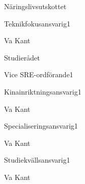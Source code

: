 \documentclass[10pt]{article}
\begin{document}
\begin{valforslagslista}
        \begin{utskott}{Näringslivsutskottet}
            \begin{post}{Teknikfokusansvarig}{1}
                \item Va Kant
            \end{post}
        \end{utskott}
        \begin{utskott}{Studierådet}
            \begin{post}{Vice SRE-ordförande}{1}
            \end{post}
            \begin{post}{Kinainriktningsansvarig}{1}
                \item Va Kant
            \end{post}
            \begin{post}{Specialiseringsansvarig}{1}
                \item Va Kant
            \end{post}
            \begin{post}{Studiekvällsansvarig}{1}
                \item Va Kant
            \end{post}
        \end{utskott}
    \end{valforslagslista}
\end{document}
